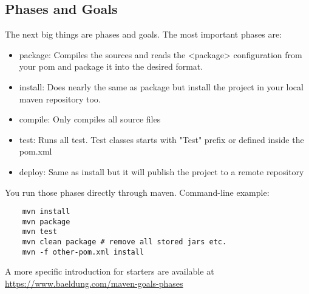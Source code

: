 \subsection{Phases and Goals} \label{chapter:intro:phases}
The next big things are phases and goals. 
The most important phases are:
\begin{itemize} 
	\item package: Compiles the sources and reads the <package> configuration from your pom and package it into the desired format. 
	\item install: Does nearly the same as package but install the project in your local maven repository too.
	\item compile: Only compiles all source files
	\item test: Runs all test. Test classes starts with "Test" prefix or defined inside the pom.xml
	\item deploy: Same as install but it will publish the project to a remote repository
\end{itemize}
You run those phases directly through maven. 
Command-line example:
\begin{lstlisting}
	mvn install
	mvn package
	mvn test
	mvn clean package # remove all stored jars etc.
	mvn -f other-pom.xml install
\end{lstlisting}

A more specific introduction for starters are available at \url{https://www.baeldung.com/maven-goals-phases}